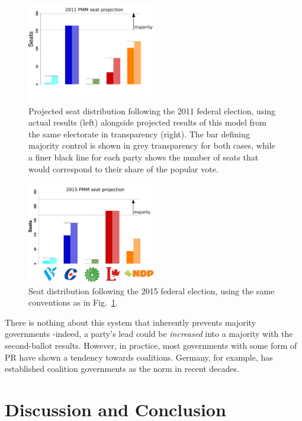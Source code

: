 \documentclass[DIV=calc, paper=a4, fontsize=11pt, twocolumn]{scrartcl}	 %
\begin{document}
\begin{figure}[h!]
  \includegraphics[width=0.50\textwidth,clip]{Figs/2011_seat_projection}
  \caption{ Projected seat distribution following the 2011 federal election, using actual results (left) alongside projected results of this model from the same electorate in transparency (right). The bar defining majority control is shown in grey transparency for both cases, while a finer black line for each party shows the number of seats that would correspond to their share of the popular vote.
}
\label{fig:hypo_2011}
\end{figure}

\begin{figure}[h!]
  \includegraphics[width=0.50\textwidth,clip]{Figs/2015_seat_projection}
  \caption{ Seat distribution following the 2015 federal election, using the same conventions as in Fig.~\ref{fig:hypo_2011}.}
\label{fig:hypo_2015}
\end{figure}

There is nothing about this system that inherently prevents majority governments \--indeed, a party's lead could be \emph{increased} into a majority with the second-ballot results. However, in practice, most governments with some form of PR have shown a tendency towards coalitions. Germany, for example, has established coalition governments as the norm in recent decades.

\section{Discussion and Conclusion}	
\end{document}

